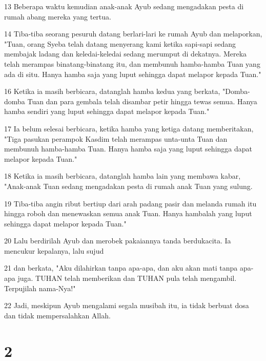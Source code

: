 \par 13 Beberapa waktu kemudian anak-anak Ayub sedang mengadakan pesta di rumah abang mereka yang tertua.
\par 14 Tiba-tiba seorang pesuruh datang berlari-lari ke rumah Ayub dan melaporkan, "Tuan, orang Syeba telah datang menyerang kami ketika sapi-sapi sedang membajak ladang dan keledai-keledai sedang merumput di dekatnya. Mereka telah merampas binatang-binatang itu, dan membunuh hamba-hamba Tuan yang ada di situ. Hanya hamba saja yang luput sehingga dapat melapor kepada Tuan."
\par 16 Ketika ia masih berbicara, datanglah hamba kedua yang berkata, "Domba-domba Tuan dan para gembala telah disambar petir hingga tewas semua. Hanya hamba sendiri yang luput sehingga dapat melapor kepada Tuan."
\par 17 Ia belum selesai berbicara, ketika hamba yang ketiga datang memberitakan, "Tiga pasukan perampok Kasdim telah merampas unta-unta Tuan dan membunuh hamba-hamba Tuan. Hanya hamba saja yang luput sehingga dapat melapor kepada Tuan."
\par 18 Ketika ia masih berbicara, datanglah hamba lain yang membawa kabar, "Anak-anak Tuan sedang mengadakan pesta di rumah anak Tuan yang sulung.
\par 19 Tiba-tiba angin ribut bertiup dari arah padang pasir dan melanda rumah itu hingga roboh dan menewaskan semua anak Tuan. Hanya hambalah yang luput sehingga dapat melapor kepada Tuan."
\par 20 Lalu berdirilah Ayub dan merobek pakaiannya tanda berdukacita. Ia mencukur kepalanya, lalu sujud
\par 21 dan berkata, "Aku dilahirkan tanpa apa-apa, dan aku akan mati tanpa apa-apa juga. TUHAN telah memberikan dan TUHAN pula telah mengambil. Terpujilah nama-Nya!"
\par 22 Jadi, meskipun Ayub mengalami segala musibah itu, ia tidak berbuat dosa dan tidak mempersalahkan Allah.

\chapter{2}

